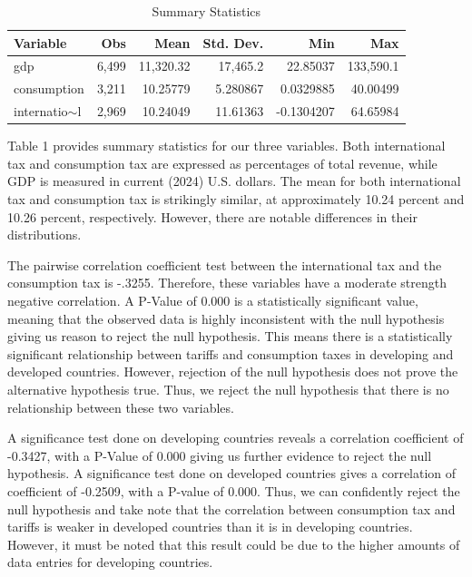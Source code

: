 \documentclass[12pt]{article}
\begin{document}
\begin{table}[h!]
\centering
\caption{Summary Statistics}
\label{tab:summary_stats}
\begin{tabular}{lrrrrr}
\hline
\textbf{Variable} & \textbf{Obs} & \textbf{Mean} & \textbf{Std. Dev.} & \textbf{Min} & \textbf{Max} \\
\hline
gdp              & 6,499        & 11,320.32     & 17,465.2           & 22.85037     & 133,590.1    \\
consumption      & 3,211        & 10.25779      & 5.280867           & 0.0329885    & 40.00499     \\
internatio$\sim$l & 2,969        & 10.24049      & 11.61363           & -0.1304207   & 64.65984     \\
\hline
\end{tabular}
\end{table}


Table 1 provides summary statistics for our three variables. Both international tax and consumption tax are expressed as percentages of total revenue, while GDP is measured in current (2024) U.S. dollars. The mean for both international tax and consumption tax is strikingly similar, at approximately 10.24 percent and 10.26 percent, respectively. However, there are notable differences in their distributions.

The pairwise correlation coefficient test between the international tax and the consumption tax is -.3255. Therefore, these variables have a moderate strength negative correlation. A P-Value of 0.000 is a statistically significant value, meaning that the observed data is highly inconsistent with the null hypothesis giving us reason to reject the null hypothesis. This means there is a statistically significant relationship between tariffs and consumption taxes in developing and developed countries. However, rejection of the null hypothesis does not prove the alternative hypothesis true. Thus, we reject the null hypothesis that there is no relationship between these two variables. 

A significance test done on developing countries reveals a correlation coefficient of -0.3427, with a P-Value of 0.000 giving us further evidence to reject the null hypothesis. A significance test done on developed countries gives a correlation of coefficient of -0.2509, with a P-value of 0.000. Thus, we can confidently reject the null hypothesis and take note that the correlation between consumption tax and tariffs is weaker in developed countries than it is in developing countries. However, it must be noted that this result could be due to the higher amounts of data entries for developing countries. 
\end{document}
